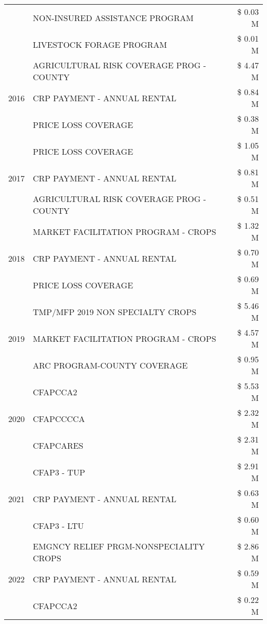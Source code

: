 \begin{tabular}{llr}
 & NON-INSURED ASSISTANCE PROGRAM & \$ 0.03 M \\
 & LIVESTOCK FORAGE PROGRAM & \$ 0.01 M \\
\cline{1-3}
\multirow[t]{3}{*}{2016} & AGRICULTURAL RISK COVERAGE PROG - COUNTY & \$ 4.47 M \\
 & CRP PAYMENT - ANNUAL RENTAL & \$ 0.84 M \\
 & PRICE LOSS COVERAGE & \$ 0.38 M \\
\cline{1-3}
\multirow[t]{3}{*}{2017} & PRICE LOSS COVERAGE & \$ 1.05 M \\
 & CRP PAYMENT - ANNUAL RENTAL & \$ 0.81 M \\
 & AGRICULTURAL RISK COVERAGE PROG - COUNTY & \$ 0.51 M \\
\cline{1-3}
\multirow[t]{3}{*}{2018} & MARKET FACILITATION PROGRAM - CROPS & \$ 1.32 M \\
 & CRP PAYMENT - ANNUAL RENTAL & \$ 0.70 M \\
 & PRICE LOSS COVERAGE & \$ 0.69 M \\
\cline{1-3}
\multirow[t]{3}{*}{2019} & TMP/MFP 2019 NON SPECIALTY CROPS & \$ 5.46 M \\
 & MARKET FACILITATION PROGRAM - CROPS & \$ 4.57 M \\
 & ARC PROGRAM-COUNTY COVERAGE & \$ 0.95 M \\
\cline{1-3}
\multirow[t]{3}{*}{2020} & CFAPCCA2 & \$ 5.53 M \\
 & CFAPCCCCA & \$ 2.32 M \\
 & CFAPCARES & \$ 2.31 M \\
\cline{1-3}
\multirow[t]{3}{*}{2021} & CFAP3 - TUP & \$ 2.91 M \\
 & CRP PAYMENT - ANNUAL RENTAL & \$ 0.63 M \\
 & CFAP3 - LTU & \$ 0.60 M \\
\cline{1-3}
\multirow[t]{3}{*}{2022} & EMGNCY RELIEF PRGM-NONSPECIALITY CROPS & \$ 2.86 M \\
 & CRP PAYMENT - ANNUAL RENTAL & \$ 0.59 M \\
 & CFAPCCA2 & \$ 0.22 M \\
\cline{1-3}
\bottomrule
\end{tabular}
